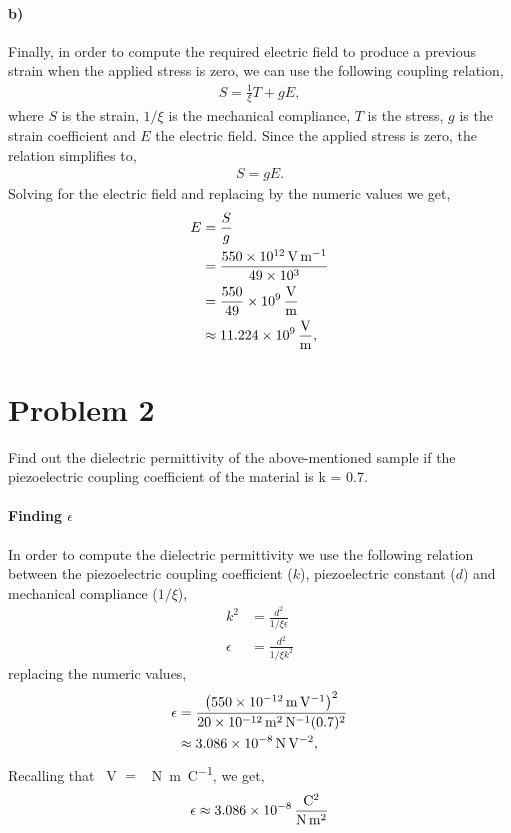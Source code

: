 \documentclass[../main.tex]{subfiles}
\begin{document}
\paragraph{b)}\label{par:1.b} Finally, in order to compute the required electric field to produce a previous strain when the applied stress is zero, we can use the following coupling relation,
\begin{align*}
    S = \frac{1}{\xi}T + g E,
\end{align*}
where $S$ is the strain, $1/\xi$ is the mechanical compliance, $T$ is the stress, $g$ is the strain coefficient and $E$ the electric field.
Since the applied stress is zero, the relation simplifies to,
\begin{align*}
    S = g E.
\end{align*}
Solving for the electric field and replacing by the numeric values we get,
\begin{align*}
    E &= \frac{S}{g} \\
      &= \frac{\SI{550d12}{\volt\per\meter}}{\num{49d3}} \\
      &= \frac{550}{49}\times\SI[per-mode=fraction]{d9}{\volt\per\meter} \\
      &\approx \SI[per-mode=fraction]{11.224d9}{\volt\per\meter}, 
\end{align*}


\section{Problem 2}

Find out the dielectric permittivity of the above-mentioned sample if the piezoelectric coupling coefficient of the material is k = \num{0.7}.

\paragraph{Finding $\epsilon$} In order to compute the dielectric permittivity we use the following relation between the piezoelectric coupling coefficient ($k$), piezoelectric constant ($d$) and mechanical compliance ($1/\xi$),
\begin{align*}
    k^2 &= \frac{d^2}{1/\xi\epsilon} \\
\epsilon &= \frac{d^2}{1/\xi k^2}
\end{align*}
replacing the numeric values,
\begin{align*}
    \epsilon &= \frac{\left(\SI{550d-12}{\meter\per\volt}\right)^2}{\SI{20d-12}{\meter\squared\per\newton} (0.7)^2} \\
             &\approx \SI{3.086d-8}{\newton\per\volt\squared},
\end{align*}
Recalling that \SI{}{\volt} $=$ \SI{}{\newton\meter\per\coulomb}, we get,
\begin{gather*}
    \epsilon\approx \SI[per-mode=fraction]{3.086d-8}{\coulomb\squared\per\newton\per\meter\squared}
\end{gather*}
\end{document}
